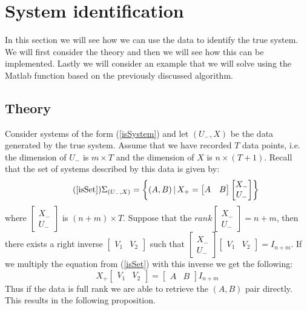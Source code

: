 \section{System identification}
In this section we will see how we can use the data to identify the true system. We will first consider the theory and then we will see how this can be implemented. Lastly we will consider an example that we will solve using the Matlab function based on the previously discussed algorithm.


\subsection{Theory}
Consider systems of the form (\ref{isSystem}) and let $(U_-,X)$ be the data generated by the true system. Assume that we have recorded $T$ data points, i.e. the dimension of $U_-$ is $m \times T$ and the dimension of $X$ is $n \times (T+1)$. Recall that the set of systems described by this data is given by:
\begin{equation}
	\tag{\ref{isSet}} 
	\Sigma_{(U_-,X)} = \left\{ (A, B) \, | \, X_{+} = \begin{bmatrix} A & B \end{bmatrix} \begin{bmatrix} X_{-} \\ U_{-} \end{bmatrix} \right\} 
\end{equation}
where $\begin{bmatrix} X_{-} \\ U_{-} \end{bmatrix}$ is $(n+m) \times T$. Suppose that the $rank \begin{bmatrix} X_{-} \\ U_{-} \end{bmatrix} = n+m$, then there exists a right inverse $\begin{bmatrix} V_1 & V_2 \end{bmatrix}$ such that $\begin{bmatrix} X_{-} \\ U_{-} \end{bmatrix} \begin{bmatrix} V_1 & V_2 \end{bmatrix} = I_{n+m}$. If we multiply the equation from (\ref{isSet}) with this inverse we get the following:
\begin{equation*}
	X_{+} \begin{bmatrix} V_1 & V_2 \end{bmatrix} = \begin{bmatrix} A & B \end{bmatrix} I_{n+m}
\end{equation*}
Thus if the data is full rank we are able to retrieve the $(A,B)$ pair directly. This results in the following proposition.

